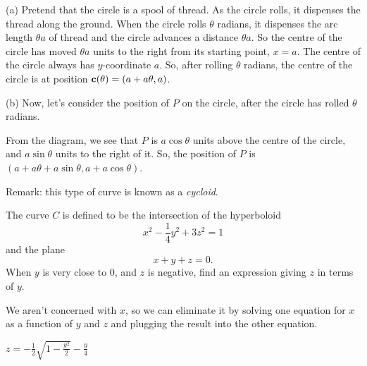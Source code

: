 \begin{solution} (a)
Pretend that the circle is a spool of thread. As the 
           circle rolls, it dispenses the thread along the ground.
           When the circle rolls $\theta$ radians, it dispenses the
           arc length $\theta a$ of thread and the circle advances
           a distance $\theta a$. So the centre of the circle has 
           moved $\theta a$ units to the right from its starting point, $x=a$. The centre of the circle always has $y$-coordinate $a$. So, after rolling $\theta$ radians, the centre of the circle is at position $\mathbf{c}(\theta)=(a+a\theta,a)$.

(b) 
Now, let's consider the position of $P$ on the circle, after the circle has rolled $\theta$ radians. 

\begin{center}
\end{center}
From the diagram, we see that $P$ is $a\cos \theta$ units above the centre of the circle, and $a\sin \theta$ units to the right of it. So, the position of $P$ is $(a+a\theta+a\sin\theta,a+a\cos\theta)$.

Remark: this type of curve is known as a \emph{cycloid}.
\end{solution}
\begin{question}\label{prob_s1.0last}
The curve $C$ is defined to be the intersection of the hyperboloid
\[x^2-\frac{1}{4}y^2+3z^2=1\]
and the plane
\[x+y+z=0.\]
When $y$ is very close to 0, and $z$ is negative, find an expression giving $z$ in terms of $y$.
\end{question}
\begin{hint}
We aren't concerned with $x$, so we can eliminate it by solving one equation for $x$ as a function
        of $y$ and $z$ and plugging the result into the other equation.
        \end{hint}
\begin{answer}
$z=-\frac12\sqrt{1-\frac{y^2}{2}}-\frac{y}{4}$
\end{answer}
